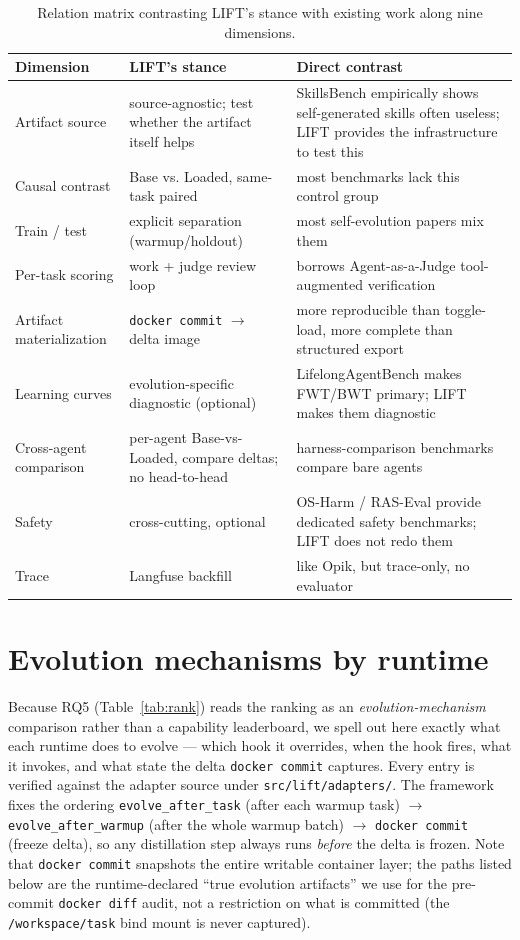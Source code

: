 \documentclass{article}
\begin{document}
\begin{table}[H]
\centering
\small
\caption{Relation matrix contrasting LIFT's stance with existing work along nine dimensions.}
\label{tab:relation}
\begin{tabular}{P{0.2\textwidth}P{0.36\textwidth}P{0.38\textwidth}}
\toprule
Dimension & LIFT's stance & Direct contrast \\
\midrule
Artifact source & source-agnostic; test whether the artifact itself helps & SkillsBench empirically shows self-generated skills often useless; LIFT provides the infrastructure to test this \\
Causal contrast & Base vs. Loaded, same-task paired & most benchmarks lack this control group \\
Train / test & explicit separation (warmup/holdout) & most self-evolution papers mix them \\
Per-task scoring & work + judge review loop & borrows Agent-as-a-Judge tool-augmented verification \\
Artifact materialization & \texttt{docker commit} $\rightarrow$ delta image & more reproducible than toggle-load, more complete than structured export \\
Learning curves & evolution-specific diagnostic (optional) & LifelongAgentBench makes FWT/BWT primary; LIFT makes them diagnostic \\
Cross-agent comparison & per-agent Base-vs-Loaded, compare deltas; no head-to-head & harness-comparison benchmarks compare bare agents \\
Safety & cross-cutting, optional & OS-Harm / RAS-Eval provide dedicated safety benchmarks; LIFT does not redo them \\
Trace & Langfuse backfill & like Opik, but trace-only, no evaluator \\
\bottomrule
\end{tabular}
\end{table}


\section{Evolution mechanisms by runtime}
\label{sec:evo-mechanisms}

Because RQ5 (Table~\ref{tab:rank}) reads the ranking as an \emph{evolution-mechanism} comparison rather than a capability leaderboard, we spell out here exactly what each runtime does to evolve --- which hook it overrides, when the hook fires, what it invokes, and what state the delta \texttt{docker commit} captures. Every entry is verified against the adapter source under \texttt{src/lift/adapters/}. The framework fixes the ordering \texttt{evolve\_after\_task} (after each warmup task) $\rightarrow$ \texttt{evolve\_after\_warmup} (after the whole warmup batch) $\rightarrow$ \texttt{docker commit} (freeze delta), so any distillation step always runs \emph{before} the delta is frozen. Note that \texttt{docker commit} snapshots the entire writable container layer; the paths listed below are the runtime-declared ``true evolution artifacts'' we use for the pre-commit \texttt{docker diff} audit, not a restriction on what is committed (the \texttt{/workspace/task} bind mount is never captured).
\end{document}
